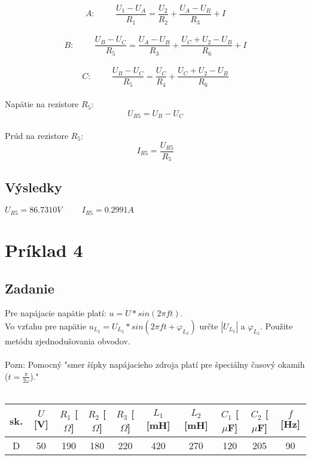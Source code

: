 \documentclass[10pt,a4paper]{article}
\begin{document}
\begin{equation*}
A: \hspace{1cm} \frac{U_1-U_A}{R_1} = \frac{U_2}{R_2} + \frac{U_A-U_B}{R_3} + I
\end{equation*}
\\
\begin{equation*}
B: \hspace{1cm} \frac{U_B-U_C}{R_5} = \frac{U_A-U_B}{R_3} + \frac{U_C+U_2-U_B}{R_6} + I
\end{equation*}
\\
\begin{equation*}
C: \hspace{1cm} \frac{U_B-U_C}{R_5} = \frac{U_C}{R_4} + \frac{U_C+U_2-U_B}{R_6}
\end{equation*}
\\
Napätie na rezistore $R_5$:
\\
\begin{equation*}
U_{R5} = U_B - U_C
\end{equation*}
\\
Prúd na rezistore $R_5$:
\\
\begin{equation*}
I_{R5} = \frac{U_{R5}}{R_5}
\end{equation*}

\subsection{Výsledky}

$U_{R5} = 86.7310 V \hspace{1cm} I_{R5} = 0.2991 A$

\section{Príklad 4}
\subsection{Zadanie}

Pre napájacie napätie platí: $u = U * sin( 2 \pi f t )$.\\
Vo vzťahu pre napätie $u_{L_2} = U_{L_2} * sin(2 \pi f t + \varphi_{L_2})$ určte $|U_{L_2}|$ a  $\varphi_{L_2}$. Použite metódu zjednodušovania obvodov.\\ \\
Pozn: Pomocný "smer šípky napájacieho zdroja platí pre špeciálny časový okamih ($t = \frac{\pi}{2 \omega}$)."
\\ \\
\begin{tabular}{|c|c|c|c|c|c|c|c|c|c|}
\hline sk. & $U$ [V] & $R_1$ [$\Omega$] & $R_2$ [$\Omega$] & $R_3$ [$\Omega$] & $L_1$ [mH] & $L_2$ [mH] & $C_1$ [$\mu$F] & $C_2$ [$\mu$F] & $f$ [Hz]\\
\hline D & 50 & 190 & 180 & 	220 & 420 & 270 & 120 & 205 & 90 \\
\hline
\end{tabular}
\end{document}
